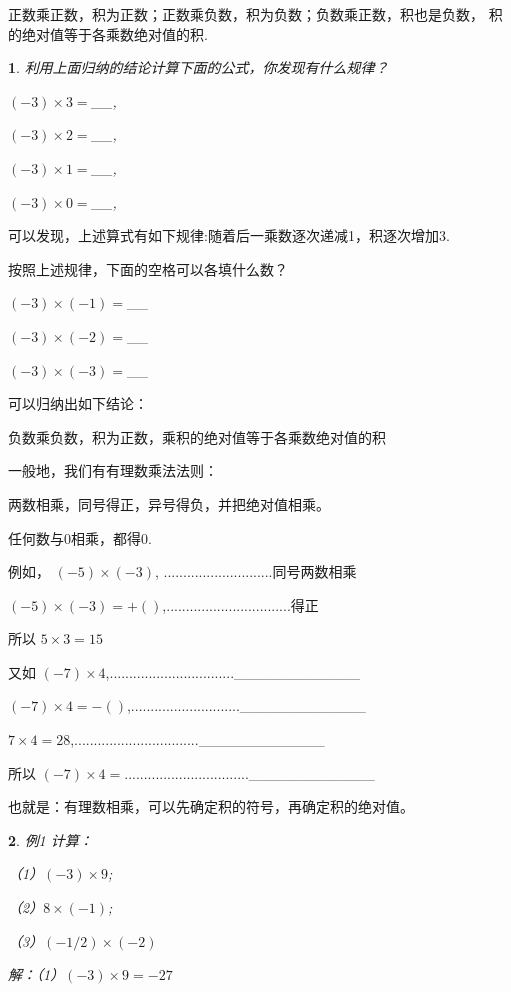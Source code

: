 \documentclass{article}
\newtheorem{example}{ }
\begin{document}
\begin{article}
正数乘正数，积为正数；正数乘负数，积为负数；负数乘正数，积也是负数，
积的绝对值等于各乘数绝对值的积.

\begin{example}

利用上面归纳的结论计算下面的公式，你发现有什么规律？

$(-3)\times3=$__,

$(-3)\times2=$__,

$(-3)\times1=$__,

$(-3)\times0=$__,

\end{example}

可以发现，上述算式有如下规律:随着后一乘数逐次递减1，积逐次增加3.

按照上述规律，下面的空格可以各填什么数？

$(-3)\times(-1)=$__

$(-3)\times(-2)=$__

$(-3)\times(-3)=$__

可以归纳出如下结论：

负数乘负数，积为正数，乘积的绝对值等于各乘数绝对值的积

一般地，我们有有理数乘法法则：

两数相乘，同号得正，异号得负，并把绝对值相乘。

任何数与0相乘，都得0.

例如，  $(-5)\times(-3)$, ............................同号两数相乘

        $(-5)\times(-3)=+( )$,................................得正
        
所以    $5\times3=15$

又如    $(-7)\times4$,................................____________

        $(-7)\times4=-()$,............................____________
        
        $7\times4=28$,................................____________
        
所以    $(-7)\times4=$................................____________        

也就是：有理数相乘，可以先确定积的符号，再确定积的绝对值。

\begin{example}

例1 计算：

（1）$(-3)\times9$;

（2）$8\times(-1)$;

（3）$(-1/2)\times(-2)$

解：（1）$(-3)\times9=-27$


\end{example}
\end{article}
\end{document}
